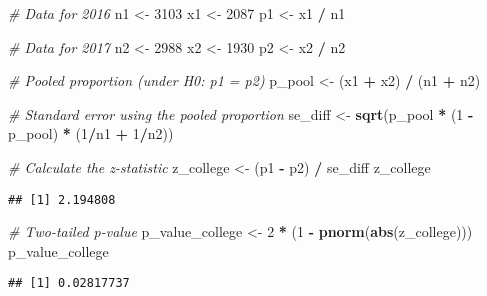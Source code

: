\documentclass[
]{article}
\newenvironment{Shaded}{\begin{snugshade}}{\end{snugshade}}
\newcommand{\CommentTok}[1]{\textcolor[rgb]{0.56,0.35,0.01}{\textit{#1}}}
\newcommand{\DecValTok}[1]{\textcolor[rgb]{0.00,0.00,0.81}{#1}}
\newcommand{\FunctionTok}[1]{\textcolor[rgb]{0.13,0.29,0.53}{\textbf{#1}}}
\newcommand{\NormalTok}[1]{#1}
\newcommand{\OtherTok}[1]{\textcolor[rgb]{0.56,0.35,0.01}{#1}}
\newcommand{\SpecialCharTok}[1]{\textcolor[rgb]{0.81,0.36,0.00}{\textbf{#1}}}
\begin{document}
\begin{Shaded}
\begin{Highlighting}[]
\CommentTok{\# Data for 2016}
\NormalTok{n1 }\OtherTok{\textless{}{-}} \DecValTok{3103}
\NormalTok{x1 }\OtherTok{\textless{}{-}} \DecValTok{2087}
\NormalTok{p1 }\OtherTok{\textless{}{-}}\NormalTok{ x1 }\SpecialCharTok{/}\NormalTok{ n1}

\CommentTok{\# Data for 2017}
\NormalTok{n2 }\OtherTok{\textless{}{-}} \DecValTok{2988}
\NormalTok{x2 }\OtherTok{\textless{}{-}} \DecValTok{1930}
\NormalTok{p2 }\OtherTok{\textless{}{-}}\NormalTok{ x2 }\SpecialCharTok{/}\NormalTok{ n2}

\CommentTok{\# Pooled proportion (under H0: p1 = p2)}
\NormalTok{p\_pool }\OtherTok{\textless{}{-}}\NormalTok{ (x1 }\SpecialCharTok{+}\NormalTok{ x2) }\SpecialCharTok{/}\NormalTok{ (n1 }\SpecialCharTok{+}\NormalTok{ n2)}

\CommentTok{\# Standard error using the pooled proportion}
\NormalTok{se\_diff }\OtherTok{\textless{}{-}} \FunctionTok{sqrt}\NormalTok{(p\_pool }\SpecialCharTok{*}\NormalTok{ (}\DecValTok{1} \SpecialCharTok{{-}}\NormalTok{ p\_pool) }\SpecialCharTok{*}\NormalTok{ (}\DecValTok{1}\SpecialCharTok{/}\NormalTok{n1 }\SpecialCharTok{+} \DecValTok{1}\SpecialCharTok{/}\NormalTok{n2))}

\CommentTok{\# Calculate the z{-}statistic}
\NormalTok{z\_college }\OtherTok{\textless{}{-}}\NormalTok{ (p1 }\SpecialCharTok{{-}}\NormalTok{ p2) }\SpecialCharTok{/}\NormalTok{ se\_diff}
\NormalTok{z\_college}
\end{Highlighting}
\end{Shaded}

\begin{verbatim}
## [1] 2.194808
\end{verbatim}

\begin{Shaded}
\begin{Highlighting}[]
\CommentTok{\# Two{-}tailed p{-}value}
\NormalTok{p\_value\_college }\OtherTok{\textless{}{-}} \DecValTok{2} \SpecialCharTok{*}\NormalTok{ (}\DecValTok{1} \SpecialCharTok{{-}} \FunctionTok{pnorm}\NormalTok{(}\FunctionTok{abs}\NormalTok{(z\_college)))}
\NormalTok{p\_value\_college}
\end{Highlighting}
\end{Shaded}

\begin{verbatim}
## [1] 0.02817737
\end{verbatim}
\end{document}
